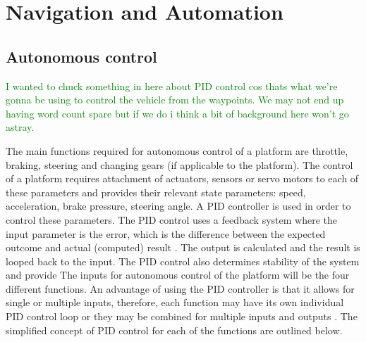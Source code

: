 \documentclass[main.tex]{subfiles}
\begin{document}
\section{Navigation and Automation}
\subsection{Autonomous control}
\textcolor{green}{I wanted to chuck something in here about PID control cos thats what we're gonna be using to control the vehicle from the waypoints. We may not end up having word count spare but if we do i think a bit of background here won't go astray.}

The main functions required for autonomous control of a platform are throttle, braking, steering and changing gears (if applicable to the platform). The control of a platform requires attachment of actuators, sensors or servo motors to each of these parameters and provides their relevant state parameters: speed, acceleration, brake pressure, steering angle. A PID controller is used in order to control these parameters. The PID control uses a feedback system where the  input parameter is the error, which is the difference between the expected outcome and actual (computed) result \parencite{johnson2005pid}. The output is calculated and the result is looped back to the input. The PID control also determines stability of the system and provide 
The inputs for autonomous control of the platform will be the four different functions. An advantage of using the PID controller is that it allows for single or multiple inputs, therefore, each function may have its own individual PID control loop or they may be combined for multiple inputs and outputs \parencite{johnson2005pid}. The simplified concept of PID control for each of the functions are outlined below. 
\end{document}
